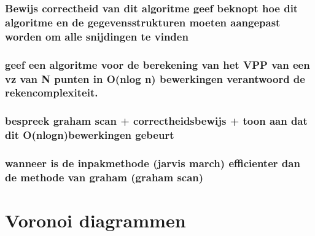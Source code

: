 \documentclass[12pt,a4paper]{article}
\begin{document}
\section{Bewijs correctheid van dit algoritme geef beknopt hoe dit algoritme en de gegevensstrukturen moeten aangepast worden om alle snijdingen te vinden}
\section{geef een algoritme voor de berekening van het VPP van een vz van N punten in O(nlog n) bewerkingen verantwoord de rekencomplexiteit.}
\section{bespreek graham scan + correctheidsbewijs + toon aan dat dit O(nlogn)bewerkingen gebeurt}
\section{wanneer is de inpakmethode (jarvis march) efficienter dan de methode van graham (graham scan)}
\fi

\part{Voronoi diagrammen}
\iffalse
\section{Bewijs: ``Een voronoi diagramma van een verzameling S heeft maximaal $2N - 5$ voronoipunten en $3N - 6$ voronoi zijden''}
\section{Bewijs: ``Een voronoi veelhoek van een punt $p_i$ is begrensd <=> $p_i$ element van $inw(CH(S))$'' Bespreek het nut van deze stelling.}
\section{Bewijs dat minimale doorloopboom deelverzameling is van de Delaunay triangulatie. Wat is het nut van deze eigenschap?}
\section{Bewijs: "Twee dichtste buren hebben een gemeenschappelijke voronoi zijde"}
\section{Geen een strategie en een hoog-niveau algoritme  voor het vinden van de maximale lege cirkel binnen de COV van een verzameling punten.}
\fi
\end{document}
